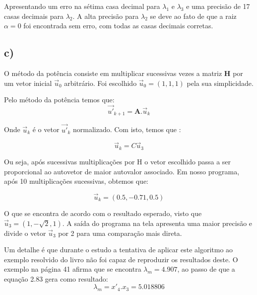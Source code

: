 \documentclass[a4wide]{report}
\begin{document}
Apresentando um erro na sétima casa decimal para $\lambda_1$ e $\lambda_3$ e uma precisão de 17 casas decimais para $\lambda_2$. A alta precisão para $\lambda_2$ se deve ao fato de que a raiz $\alpha = 0$ foi encontrada sem erro, com todas as casas decimais corretas.


\subsection*{c)}
O método da potência consiste em multiplicar sucessivas vezes a matriz \textbf{H} por um vetor inicial $\overrightarrow{u}_0$ arbitrário. Foi escolhido $\overrightarrow{u}_0 = (1,1,1)$ pela sua simplicidade.

Pelo método da potência temos que: 
\begin{equation}
\overrightarrow{u'}_{k+1} = \textbf{A}. \overrightarrow{u}_{k}
\end{equation}

Onde $\overrightarrow{u}_{k}$ é o vetor $\overrightarrow{u'}_{k}$ normalizado. Com isto, temos que :


\begin{equation}
\overrightarrow{u}_{k} = C \overrightarrow{u}_{3} 
\end{equation}

Ou seja, após sucessivas multiplicações por H o vetor escolhido passa a ser proporcional ao autovetor de maior autovalor associado. Em nosso programa, após 10 multiplicações sucessivas, obtemos que:

\begin{equation}
\overrightarrow{u}_{k} = (0.5,-0.71,0.5) 
\end{equation}

O que se encontra de acordo com o resultado esperado, visto que $\overrightarrow{u}_{3} = (1,-\sqrt{2},1)$. A saída do programa na tela apresenta uma maior precisão e divide o vetor $\overrightarrow{u}_{3}$ por 2 para uma comparação mais direta.


  
Um detalhe é que durante o estudo a tentativa de aplicar este algoritmo ao exemplo resolvido do livro não foi capaz de reproduzir os resultados deste. O exemplo na página 41 afirma que se encontra $\lambda_m = 4.907$, ao passo de que a equação 2.83 gera como resultado:
\begin{equation}
\lambda_m = x'_4.x_3 = 5.018806
\end{equation}
\end{document}
